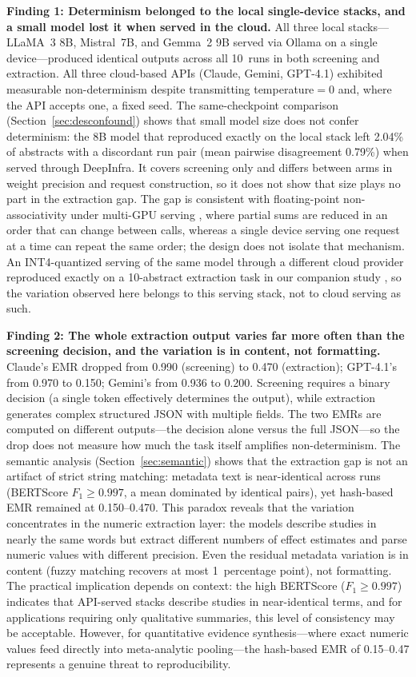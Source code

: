 \documentclass[preprint,review,12pt,authoryear]{elsarticle}
\begin{document}
\textbf{Finding 1: Determinism belonged to the local single-device stacks, and a small model lost it when served in the cloud.}
All three local stacks---LLaMA~3 8B, Mistral~7B, and Gemma~2 9B served via Ollama on a single device---produced identical outputs across all 10~runs in both screening and extraction.
All three cloud-based APIs (Claude, Gemini, GPT-4.1) exhibited measurable non-determinism despite transmitting temperature${=}$0 and, where the API accepts one, a fixed seed.
The same-checkpoint comparison (Section~\ref{sec:desconfound}) shows that small model size does not confer determinism: the 8B model that reproduced exactly on the local stack left 2.04\% of abstracts with a discordant run pair (mean pairwise disagreement 0.79\%) when served through DeepInfra. It covers screening only and differs between arms in weight precision and request construction, so it does not show that size plays no part in the extraction gap. The gap is consistent with floating-point non-associativity under multi-GPU serving \citep{karelin2024indeterminism}, where partial sums are reduced in an order that can change between calls, whereas a single device serving one request at a time can repeat the same order; the design does not isolate that mechanism. An INT4-quantized serving of the same model through a different cloud provider reproduced exactly on a 10-abstract extraction task in our companion study \citep{rover2026jair}, so the variation observed here belongs to this serving stack, not to cloud serving as such.

\textbf{Finding 2: The whole extraction output varies far more often than the screening decision, and the variation is in content, not formatting.}
Claude's EMR dropped from 0.990 (screening) to 0.470 (extraction); GPT-4.1's from 0.970 to 0.150; Gemini's from 0.936 to 0.200.
Screening requires a binary decision (a single token effectively determines the output), while extraction generates complex structured JSON with multiple fields.
The two EMRs are computed on different outputs---the decision alone versus the full JSON---so the drop does not measure how much the task itself amplifies non-determinism. The semantic analysis (Section~\ref{sec:semantic}) shows that the extraction gap is not an artifact of strict string matching: metadata text is near-identical across runs (BERTScore $F_1{\geq}0.997$, a mean dominated by identical pairs), yet hash-based EMR remained at 0.150--0.470.
This paradox reveals that the variation concentrates in the numeric extraction layer: the models describe studies in nearly the same words but extract different numbers of effect estimates and parse numeric values with different precision.
Even the residual metadata variation is in content (fuzzy matching recovers at most 1~percentage point), not formatting.
The practical implication depends on context: the high BERTScore ($F_1{\geq}0.997$) indicates that API-served stacks describe studies in near-identical terms, and for applications requiring only qualitative summaries, this level of consistency may be acceptable.
However, for quantitative evidence synthesis---where exact numeric values feed directly into meta-analytic pooling---the hash-based EMR of 0.15--0.47 represents a genuine threat to reproducibility.
\end{document}
